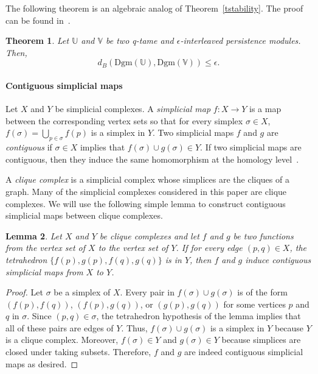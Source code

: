 \documentclass[a4paper]{article}
\newcommand\U{\mathbb{U}}
\newcommand\V{\mathbb{V}}
\newcommand\Dgm[1]{\mathrm{Dgm}(#1)}
\newtheorem{theorem}{Theorem}[section]
\newtheorem{lemma}[theorem]{Lemma}
\begin{document}
The following theorem is an algebraic analog of Theorem~\ref{tstability}.
The proof can be found in~\cite{sspmCDGO}.

\begin{theorem}\label{tModStability}
Let $\U$ and $\V$ be two q-tame and $\epsilon$-interleaved persistence modules. 
Then,
\[
  d_B(\Dgm{\U},\Dgm{\V})\leq\epsilon.
\]
\end{theorem}

\paragraph{Contiguous simplicial maps\\}
Let $X$ and $Y$ be simplicial complexes.
A \emph{simplicial map} $f:X\to Y$ is a map between the corresponding vertex sets so that for every simplex $\sigma\in X$, $f(\sigma) = \bigcup_{p\in \sigma}f(p)$ is a simplex in $Y$.
Two simplicial maps $f$ and $g$ are \emph{contiguous} if $\sigma \in X$ implies that $f(\sigma)\cup g(\sigma)\in Y$.
 If two simplicial maps are contiguous, then they induce the same homomorphism at the homology level~\cite[Chapter 1]{munkres84elements}.

A \emph{clique complex} is a simplicial complex whose simplices are the cliques of a graph.
Many of the simplicial complexes considered in this paper are clique complexes.
We will use the following simple lemma to construct contiguous simplicial maps between clique complexes.

\begin{lemma}\label{lem:contiguity_and_cliques}
Let $X$ and $Y$ be clique complexes and let $f$ and $g$ be two functions from the vertex set of $X$ to the vertex set of $Y$.
If for every edge $(p,q)\in X$, the tetrahedron $\{f(p), g(p), f(q), g(q)\}$ is in $Y$, then $f$ and $g$ induce contiguous simplicial maps from $X$ to $Y$.
\end{lemma}

\begin{proof}
  Let $\sigma$ be a simplex of $X$.
  Every pair in $f(\sigma)\cup g(\sigma)$ is of the form $(f(p),f(q))$, $(f(p),g(q))$, or $(g(p),g(q))$ for some vertices $p$ and $q$ in $\sigma$.
  Since $(p,q)\in \sigma$, the tetrahedron hypothesis of the lemma implies that all of these pairs are edges of $Y$.
  Thus, $f(\sigma)\cup g(\sigma)$ is a simplex in $Y$ because $Y$ is a clique complex.
  Moreover, $f(\sigma)\in Y$ and $g(\sigma)\in Y$ because simplices are closed under taking subsets.
  Therefore, $f$ and $g$ are indeed contiguous simplicial maps as desired.
\end{proof}
\end{document}
